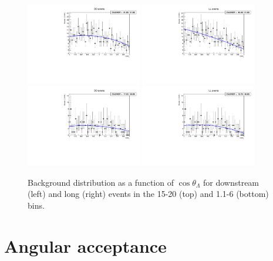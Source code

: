 \begin{figure}[h]
\centering
\includegraphics[width=0.45\textwidth]{Lmumu/figs/AngularBkgFits/BkgFitB_highq2_DD.pdf}
\includegraphics[width=0.45\textwidth]{Lmumu/figs/AngularBkgFits/BkgFitB_highq2_LL.pdf}
\includegraphics[width=0.45\textwidth]{Lmumu/figs/AngularBkgFits/BkgFitB_lowq2_DD.pdf}
\includegraphics[width=0.45\textwidth]{Lmumu/figs/AngularBkgFits/BkgFitB_lowq2_LL.pdf}
\caption{Background distribution as a function of $\cos\theta_\Lambda$ for downstream (left) and long (right)
events in the 15-20 \gevgevcccc (top) and 1.1-6 \gevgevcccc (bottom) \qsq bins. }
\label{fig:cosThetaBbkg}
\end{figure}


\section{Angular acceptance}
\label{sec:AngEff}

